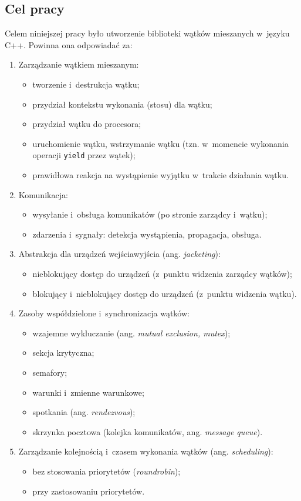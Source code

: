 \documentclass[11pt,makeidx]{mwart}
\begin{document}
\subsection{Cel pracy}
\indent
	Celem niniejszej pracy było utworzenie biblioteki wątków mieszanych
	w~języku C++.
	Powinna ona odpowiadać za:
	\begin{enumerate}
		\item Zarządzanie wątkiem mieszanym:
		\begin{itemize}
			\item tworzenie i~destrukcja wątku;
			\item przydział kontekstu wykonania (stosu) dla wątku;
			\item przydział wątku do procesora;
			\item uruchomienie wątku, wstrzymanie wątku (tzn. w~momencie wykonania operacji {\tt yield} przez wątek);
			\item prawidłowa reakcja na wystąpienie wyjątku w~trakcie działania wątku.
		\end{itemize}
		\item Komunikacja:
		\begin{itemize}
			\item wysyłanie i~obsługa komunikatów (po stronie zarządcy i~wątku);
			\item zdarzenia i~sygnały: detekcja wystąpienia, propagacja, obsługa.
		\end{itemize}
		\item \label{itm:communication} Abstrakcja dla urządzeń wejścia\dywiz wyjścia (ang. \emph{jacketing}):
		\begin{itemize}
			\item nieblokujący dostęp do urządzeń (z~punktu widzenia zarządcy wątków);
			\item blokujący i~nieblokujący dostęp do urządzeń (z~punktu widzenia wątku).
		\end{itemize}
		\item \label{itm:shared} Zasoby współdzielone i~synchronizacja wątków:
		\begin{itemize}
			\item wzajemne wykluczanie (ang. \emph{mutual exclusion, mutex});
			\item sekcja krytyczna;
			\item semafory;
			\item warunki i~zmienne warunkowe;
			\item spotkania (ang. \emph{rendezvous});
			\item skrzynka pocztowa (kolejka komunikatów, ang. \emph{message queue}).
		\end{itemize}
		\item Zarządzanie kolejnością i~czasem wykonania wątków (ang. \emph{scheduling}):
		\begin{itemize}
			\item bez stosowania priorytetów (\emph{round\dywiz robin});
			\item przy zastosowaniu priorytetów.
		\end{itemize}
	\end{enumerate}
\end{document}
